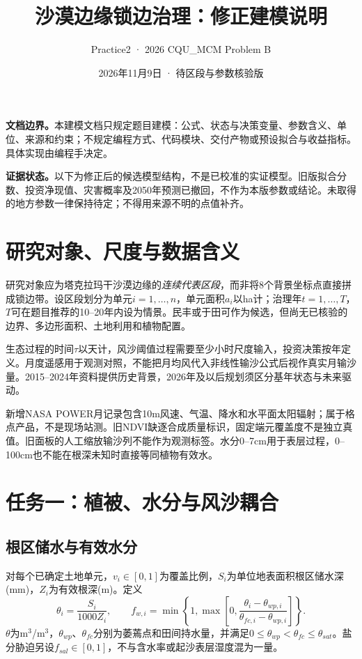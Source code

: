 \documentclass[11pt,a4paper]{ctexart}
\title{沙漠边缘锁边治理：修正建模说明}
\author{Practice2 · 2026 CQU\_MCM Problem B}
\date{2026年11月9日 · 待区段与参数核验版}
\begin{document}
\maketitle
\noindent\textbf{文档边界。}本建模文档只规定题目建模：公式、状态与决策变量、参数含义、单位、来源和约束；不规定编程方式、代码模块、交付产物或预设拟合与收益指标。具体实现由编程手决定。

\noindent\textbf{证据状态。}以下为修正后的候选模型结构，不是已校准的实证模型。旧版拟合分数、投资净现值、灾害概率及2050年预测已撤回，不作为本版参数或结论。未取得的地方参数一律保持待定；不得用来源不明的点值补齐。

\section{研究对象、尺度与数据含义}
研究对象应为塔克拉玛干沙漠边缘的\emph{连续代表区段}，而非将8个背景坐标点直接拼成锁边带。设区段划分为单元$i=1,\ldots,n$，单元面积$a_i$以ha计；治理年$t=1,\ldots,T$，$T$可在题目推荐的10--20年内设为情景。民丰或于田可作为候选，但尚无已核验的边界、多边形面积、土地利用和植物配置。

生态过程的时间$\tau$以天计，风沙阈值过程需要至少小时尺度输入，投资决策按年定义。月度遥感用于观测对照，不能把月均风代入非线性输沙公式后视作真实月输沙量。2015--2024年资料提供历史背景，2026年及以后规划须区分基年状态与未来驱动。

新增NASA POWER月记录包含10m风速、气温、降水和水平面太阳辐射；属于格点产品，不是现场站测。旧NDVI缺逐合成质量标识，固定端元覆盖度不是独立真值。旧面板的人工缩放输沙列不能作为观测标签。水分0--7cm用于表层过程，0--100cm也不能在根深未知时直接等同植物有效水。

\section{任务一：植被、水分与风沙耦合}
\subsection{根区储水与有效水分}
对每个已确定土地单元，$v_i\in[0,1]$为覆盖比例，$S_i$为单位地表面积根区储水深(mm)，$Z_i$为有效根深(m)。定义
\begin{equation}
 \theta_i=\frac{S_i}{1000Z_i},\qquad
 f_{w,i}=\min\left\{1,\max\left[0,\frac{\theta_i-\theta_{wp,i}}{\theta_{fc,i}-\theta_{wp,i}}\right]\right\}.
\end{equation}
$\theta$为m$^3$/m$^3$，$\theta_{wp}$、$\theta_{fc}$分别为萎蔫点和田间持水量，并满足$0\leq\theta_{wp}<\theta_{fc}\leq\theta_{sat}$。盐分胁迫另设$f_{sal}\in[0,1]$，不与含水率或起沙表层湿度混为一量。
\end{document}
